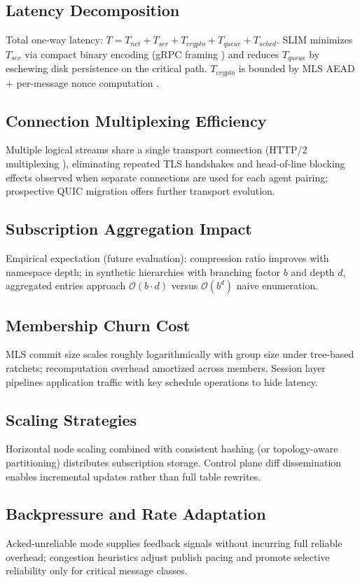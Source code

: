 \documentclass{article}
\theoremstyle{definition}
\theoremstyle{remark}
\begin{document}
\subsection{Latency Decomposition}
Total one-way latency: \( T = T_{net} + T_{ser} + T_{crypto} + T_{queue} + T_{sched} \). SLIM minimizes \(T_{ser}\) via compact binary encoding (gRPC framing \citep{grpc}) and reduces \(T_{queue}\) by eschewing disk persistence on the critical path. \(T_{crypto}\) is bounded by MLS AEAD + per-message nonce computation \citep{rfc9420}.
\subsection{Connection Multiplexing Efficiency}
Multiple logical streams share a single transport connection (HTTP/2 multiplexing \citep{http2}), eliminating repeated TLS handshakes and head-of-line blocking effects observed when separate connections are used for each agent pairing; prospective QUIC migration \citep{quic} offers further transport evolution.
\subsection{Subscription Aggregation Impact}
Empirical expectation (future evaluation): compression ratio improves with namespace depth; in synthetic hierarchies with branching factor \(b\) and depth \(d\), aggregated entries approach \(\mathcal{O}(b \cdot d)\) versus \(\mathcal{O}(b^d)\) naive enumeration.
\subsection{Membership Churn Cost}
MLS commit size scales roughly logarithmically with group size under tree-based ratchets; recomputation overhead amortized across members. Session layer pipelines application traffic with key schedule operations to hide latency.
\subsection{Scaling Strategies}
Horizontal node scaling combined with consistent hashing (or topology-aware partitioning) distributes subscription storage. Control plane diff dissemination enables incremental updates rather than full table rewrites.
\subsection{Backpressure and Rate Adaptation}
Acked-unreliable mode supplies feedback signals without incurring full reliable overhead; congestion heuristics adjust publish pacing and promote selective reliability only for critical message classes.
\end{document}
